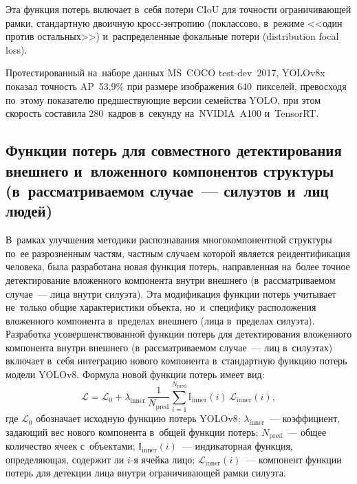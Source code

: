 Эта функция потерь включает в~себя потери CIoU для точности
ограничивающей рамки, стандартную двоичную кросс-энтропию (поклассово,
в~режиме <<один против остальных>>) и~распределенные фокальные потери (distribution focal loss).

Протестированный на~наборе данных MS~COCO test-dev~2017, YOLOv8x
показал точность AP~53,9\% при размере изображения 640~пикселей,
превосходя по~этому показателю предшествующие версии семейства YOLO, при этом
скорость составила 280~кадров в~секунду на~NVIDIA~A100 и~TensorRT.

\subsection{Функции потерь для совместного детектирования внешнего и~вложенного компонентов структуры (в~рассматриваемом случае~--- силуэтов и~лиц людей)}\label{sec:ch2/loss}

В~рамках улучшения методики распознавания многокомпонентной структуры
по~ее разрозненным частям, частным случаем которой является реидентификация
человека, была разработана новая функция потерь, направленная на~более точное
детектирование вложенного компонента внутри внешнего (в~рассматриваемом
случае~--- лица внутри силуэта). Эта модификация функции потерь
учитывает не~только общие характеристики объекта, но~и~специфику
расположения вложенного компонента в~пределах внешнего (лица в~пределах силуэта). Разработка усовершенствованной
функции потерь для детектирования вложенного компонента внутри внешнего
(в~рассматриваемом случае~--- лиц в~силуэтах) включает в~себя
интеграцию нового компонента в~стандартную функцию потерь модели
YOLOv8. Формула новой функции потерь имеет вид:
\begin{equation}\label{eq:ch2/loss-modified}
    \mathcal{L}=\mathcal{L}_0+\lambda_{\text{inner}}\,\frac{1}{N_{\text{pred}}}\sum_{i=1}^{N_{\text{pred}}}\mathbb{I}_{\text{inner}}(i)\,\mathcal{L}_{\text{inner}}(i),
\end{equation}
где $\mathcal{L}_0$ обозначает исходную функцию потерь YOLOv8;
$\lambda_{\text{inner}}$~--- коэффициент, задающий вес нового компонента
в~общей функции потерь; $N_{\text{pred}}$~--- общее количество ячеек
с~объектами; $\mathbb{I}_{\text{inner}}(i)$~--- индикаторная функция,
определяющая, содержит ли $i$-я ячейка лицо; $\mathcal{L}_{\text{inner}}(i)$~---
компонент функции потерь для детекции лица внутри ограничивающей рамки
силуэта.

